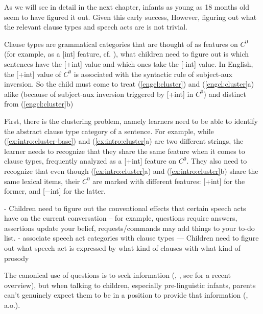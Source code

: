 As we will see in detail in the next chapter, infants as young as 18 months old seem to have figured it out. Given this early success, However, figuring out what the relevant clause types and speech acts are is not trivial. 


Clause types are grammatical categories that are thought of as features on $C^{0}$ (for example, as a [\textpm int] feature,  cf. \cite{katzpostal1964, baker1970int, langacker1974q, chomsky1995, rizzi1997, rizzi2001int, chomskylasnik1977, cheng1991}), what children need to figure out is which sentences have the [+int] value and which ones take the [-int] value. In English, the [+int] value of $C^{0}$ is associated with the syntactic rule of subject-aux inversion. So the child must come to treat (\ref{engcl:cluster}) and (\ref{engcl:cluster}a) alike (because of subject-aux inversion triggered by [+int] in $C^{0}$) and distinct from (\ref{engcl:cluster}b)

First, there is the clustering problem, namely learners need to be able to identify the abstract clause type category of a sentence. For example, while (\ref{ex:intro:cluster-base}) and (\ref{ex:intro:cluster}a) are two different strings, the learner needs to recognize that they share the same feature when it comes to clause types, frequently analyzed as a [+int] feature on $C^{0}$. They also need to recognize that even though (\ref{ex:intro:cluster}a) and (\ref{ex:intro:cluster}b) share the same lexical items, their $C^{0}$ are marked with different features: [+int] for the former, and [$-$int] for the latter.

- Children need to figure out the conventional effects that certain speech acts have on the current conversation
-- for example, questions require answers, assertions update your belief, requests/commands may add things to your to-do list.
- associate speech act categories with clause types
--- Children need to figure out what speech act is expressed by what kind of clauses with what kind of prosody

The canonical use of questions is to seek information (\citealt{searle1975tax}, \citealt{levinson1983}, see \citealt{krifka2011q} for a recent overview), but when talking to children, especially pre-linguistic infants, parents can’t genuinely expect them to be in a position to provide that information (\citealt{holzman1972, shatz1978comprehension, tamir1980, yu2019pedagogical}, a.o.).





